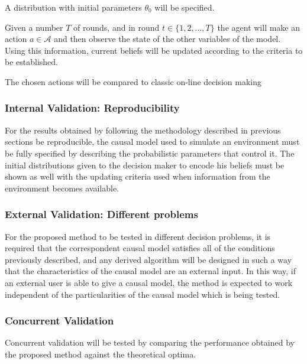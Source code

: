 \documentclass[english,letterpaper,12pt,final]{article}
\theoremstyle{definition}
\begin{document}
A distribution with initial parameters $\theta_0$ will be specified. 

Given a number $T$ of rounds, and in round $t \in \{1,2,...,T \}$ the agent will make an action $a \in \mathcal{A}$ and then observe the state of the other variables of the model. Using this information, current beliefs will be updated according to the criteria to be established.  

The chosen actions will be compared to classic on-line decision making 
\subsubsection{Internal Validation: Reproducibility}
For the results obtained by following the methodology described in previous sections be reproducible, the causal model used to simulate an environment must be fully specified by describing the probabilistic parameters that control it. The initial distributions given to the decision maker to encode his beliefs must be shown as well with the updating criteria used when information from the environment becomes available. 
\subsubsection{External Validation: Different problems}
For the proposed method to be tested in different decision problems, it is required that the correspondent causal model satisfies all of the conditions previously described, and any derived algorithm will be designed in such a way that the characteristics of the causal model are an external input. In this way, if an external user is able to give a causal model, the method is expected to work independent of the particularities of the causal model which is being tested.
\subsubsection{Concurrent Validation}
Concurrent validation will be tested by comparing the performance obtained by the proposed method against the theoretical optima.
\end{document}
